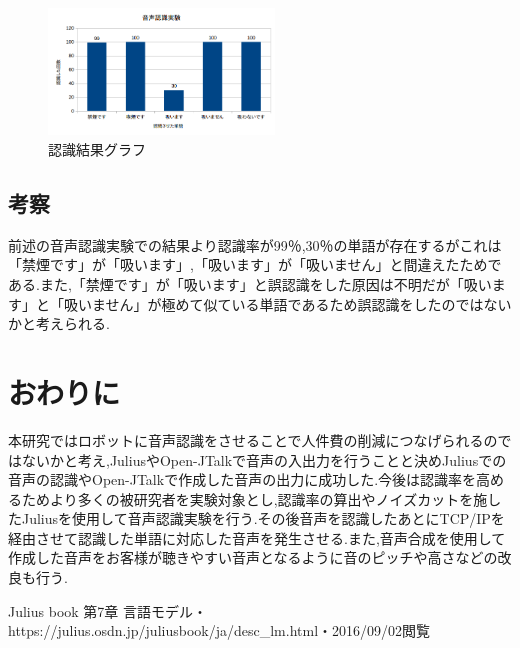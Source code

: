 \documentclass[twocolumn,11pt]{sotsuken_abst}
\begin{document}
\begin{figure}[htbp]
\begin{center}
\includegraphics[width=60mm]{img/result.png}
\caption{認識結果グラフ}
\label{fig:result}
\end{center}
\end{figure}


\subsection{考察}
前述の音声認識実験での結果より認識率が99％,30％の単語が存在するがこれは「禁煙です」が「吸います」,「吸います」が「吸いません」と間違えたためである.また,「禁煙です」が「吸います」と誤認識をした原因は不明だが「吸います」と「吸いません」が極めて似ている単語であるため誤認識をしたのではないかと考えられる.


\section{おわりに}
本研究ではロボットに音声認識をさせることで人件費の削減につなげられるのではないかと考え,JuliusやOpen-JTalkで音声の入出力を行うことと決めJuliusでの音声の認識やOpen-JTalkで作成した音声の出力に成功した.今後は認識率を高めるためより多くの被研究者を実験対象とし,認識率の算出やノイズカットを施したJuliusを使用して音声認識実験を行う.その後音声を認識したあとにTCP/IPを経由させて認識した単語に対応した音声を発生させる.また,音声合成を使用して作成した音声をお客様が聴きやすい音声となるように音のピッチや高さなどの改良も行う.


\begin{thebibliography}{1}
 Julius book 第7章 言語モデル・https://julius.osdn.jp/juliusbook/ja/desc\_lm.html・2016/09/02閲覧
\end{thebibliography}
\end{document}
